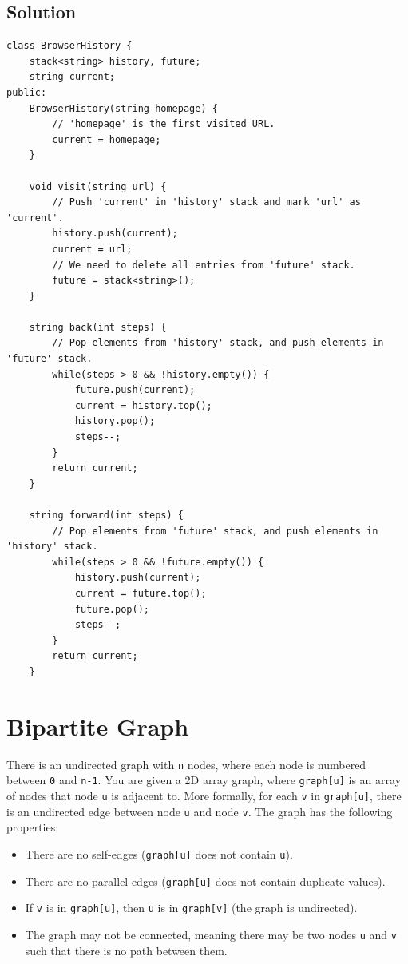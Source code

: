 \documentclass[11pt]{article}
\begin{document}
\subsection{Solution}
\label{sec:org15d8196}
\begin{verbatim}
class BrowserHistory {
    stack<string> history, future;
    string current;
public:
    BrowserHistory(string homepage) {
        // 'homepage' is the first visited URL.
        current = homepage;
    }

    void visit(string url) {
        // Push 'current' in 'history' stack and mark 'url' as 'current'.
        history.push(current);
        current = url;
        // We need to delete all entries from 'future' stack.
        future = stack<string>();
    }

    string back(int steps) {
        // Pop elements from 'history' stack, and push elements in 'future' stack.
        while(steps > 0 && !history.empty()) {
            future.push(current);
            current = history.top();
            history.pop();
            steps--;
        }
        return current;
    }

    string forward(int steps) {
        // Pop elements from 'future' stack, and push elements in 'history' stack.
        while(steps > 0 && !future.empty()) {
            history.push(current);
            current = future.top();
            future.pop();
            steps--;
        }
        return current;
    }
\end{verbatim}

\section{Bipartite Graph}
\label{sec:org419f29b}
There is an undirected graph with \texttt{n} nodes, where each node is numbered between \texttt{0} and \texttt{n-1}. You are given a 2D array graph, where \texttt{graph[u]} is an array of nodes that node \texttt{u} is adjacent to. More formally, for each \texttt{v} in \texttt{graph[u]}, there is an undirected edge between node \texttt{u} and node \texttt{v}. The graph has the following properties:

\begin{itemize}
\item There are no self-edges (\texttt{graph[u]} does not contain \texttt{u}).
\item There are no parallel edges (\texttt{graph[u]} does not contain duplicate values).
\item If \texttt{v} is in \texttt{graph[u]}, then \texttt{u} is in \texttt{graph[v]} (the graph is undirected).
\item The graph may not be connected, meaning there may be two nodes \texttt{u} and \texttt{v} such that there is no path between them.
\end{itemize}
\end{document}
